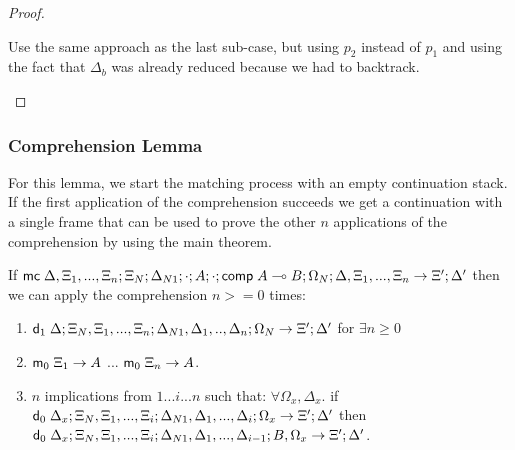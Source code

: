\begin{proof}
\begin{itemize}
\begin{enumerate}
         Use the same approach as the last sub-case, but using $p_2$ instead of $p_1$ and using the fact that $\Delta_b$ was already reduced because we had to backtrack.
      \end{enumerate}
   \end{itemize}
   
   
\end{proof}

\subsubsection{Comprehension Lemma}

For this lemma, we start the matching process with an empty continuation stack. If the first application of the comprehension succeeds we get a continuation with a single frame that can be used to prove the other $n$ applications of the comprehension by using the main theorem.

If $\mathsf{mc} \; \Delta, \Xi_1, ..., \Xi_n; \Xi_N; \Delta_{N1}; \cdot; A; \cdot; \mathsf{comp} \; A \multimap B; \Omega_N; \Delta, \Xi_1, ..., \Xi_n \rightarrow \Xi'; \Delta'$ then we can apply the comprehension $n >= 0$ times:
\begin{enumerate}
   \item $\mathsf{d}_1 \; \Delta; \Xi_N, \Xi_1, ..., \Xi_n; \Delta_{N1}, \Delta_1, .., \Delta_n; \Omega_N \rightarrow \Xi'; \Delta'$ for $\exists n \geq 0$
   \item $\mathsf{m}_0 \; \Xi_1 \rightarrow A$ ... $\mathsf{m}_0 \; \Xi_n \rightarrow A$.
   \item $n$ implications from $1 ... i ... n$ such that: $\forall \Omega_x, \Delta_x.$ if $\mathsf{d}_0 \; \Delta_x; \Xi_N, \Xi_1, ..., \Xi_i; \Delta_{N1}, \Delta_1, ..., \Delta_i; \Omega_x \rightarrow \Xi'; \Delta'$ then $\mathsf{d}_0 \; \Delta_x; \Xi_N, \Xi_1, ..., \Xi_i; \Delta_{N1}, \Delta_1, ..., \Delta_{i-1}; B, \Omega_x \rightarrow \Xi'; \Delta'$.
\end{enumerate}


